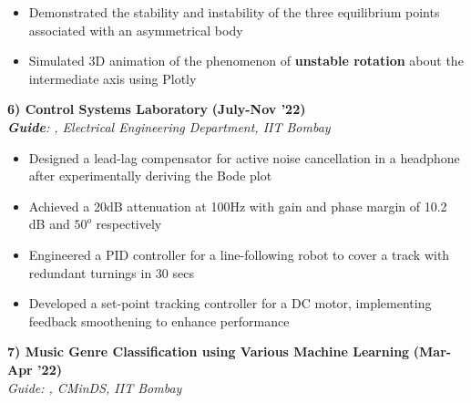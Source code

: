 \documentclass[10pt,letterpaper,sans]{moderncv}        %
\newcommand\y{4}
\begin{document}
\begin{itemize}
    \item Demonstrated the stability and instability of the three equilibrium points associated with an asymmetrical body
    \item Simulated 3D animation of the phenomenon of \textbf{unstable rotation} about the intermediate axis using Plotly
\end{itemize}
\hrulefill{}
\vspace{\y pt}


\textbf{6) Control Systems Laboratory} \hfill{\textbf{(July-Nov '22)}} \\ 
\textit{\textbf{Guide}: , Electrical Engineering Department, IIT Bombay} 


\begin{itemize}
    \item Designed a lead-lag compensator for active noise cancellation in a headphone after experimentally deriving the Bode plot
    \item Achieved a 20dB attenuation at 100Hz with gain and phase margin of 10.2 dB and $50^o$ respectively
    \item Engineered a PID controller for a line-following robot to cover a track with redundant turnings in 30 secs
    \item Developed a set-point tracking controller for a DC motor, implementing feedback smoothening to enhance performance
    
\end{itemize} 
\hrulefill{}

\vspace{\y pt}
\textbf{7) Music Genre Classification using Various Machine Learning} \hfill \textbf{(Mar-Apr '22)}\\
\textit{Guide: , CMinDS, IIT Bombay}
\end{document}
